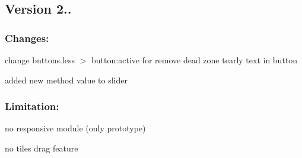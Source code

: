 \subsection*{Version 2..}

\subsubsection*{Changes\-:}


\begin{DoxyItemize}
\item change buttons.\-less $>$ button\-:active for remove dead zone tearly text in button
\item added new method value to slider
\end{DoxyItemize}

\subsubsection*{Limitation\-:}


\begin{DoxyItemize}
\item no responsive module (only prototype)
\item no tiles drag feature 
\end{DoxyItemize}